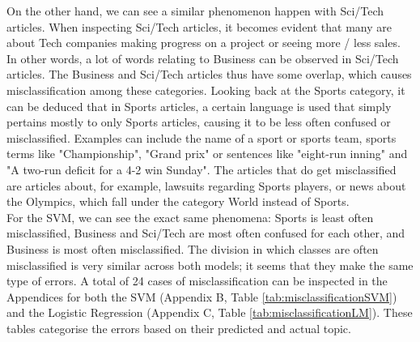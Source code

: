 \documentclass[12pt,a4paper,english]{article}
\begin{document}
On the other hand, we can see a similar phenomenon happen with Sci/Tech articles. When inspecting Sci/Tech articles, it becomes evident that many are about Tech companies making progress on a project or seeing more / less sales. In other words, a lot of words relating to Business can be observed in Sci/Tech articles. The Business and Sci/Tech articles thus have some overlap, which causes misclassification among these categories. Looking back at the Sports category, it can be deduced that in Sports articles, a certain language is used that simply pertains mostly to only Sports articles, causing it to be less often confused or misclassified. Examples can include the name of a sport or sports team, sports terms like "Championship", "Grand prix" or sentences like "eight-run inning" and "A two-run deficit for a 4-2 win Sunday". The articles that do get misclassified are articles about, for example, lawsuits regarding Sports players, or news about the Olympics, which fall under the category World instead of Sports.
 \\
For the SVM, we can see the exact same phenomena: Sports is least often misclassified, Business and Sci/Tech are most often confused for each other, and Business is most often misclassified. The division in which classes are often misclassified is very similar across both models; it seems that they make the same type of errors. A total of 24 cases of misclassification can be inspected in the Appendices for both the SVM (Appendix B, Table \ref{tab:misclassificationSVM}) and the Logistic Regression (Appendix C, Table \ref{tab:misclassificationLM}). These tables categorise the errors based on their predicted and actual topic.
\\
\end{document}

